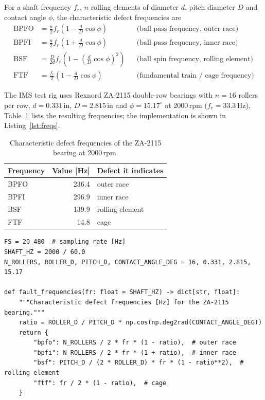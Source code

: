 \documentclass[11pt]{article}
\begin{document}
For a shaft frequency $f_r$, $n$ rolling elements of diameter $d$, pitch diameter $D$ and contact angle
$\phi$, the characteristic defect frequencies are
\begin{align}
\text{BPFO} &= \frac{n}{2} f_r \left(1 - \frac{d}{D}\cos\phi\right) && \text{(ball pass frequency, outer race)}\\
\text{BPFI} &= \frac{n}{2} f_r \left(1 + \frac{d}{D}\cos\phi\right) && \text{(ball pass frequency, inner race)}\\
\text{BSF}  &= \frac{D}{2d} f_r \left(1 - \left(\frac{d}{D}\cos\phi\right)^2\right) && \text{(ball spin frequency, rolling element)}\\
\text{FTF}  &= \frac{f_r}{2} \left(1 - \frac{d}{D}\cos\phi\right) && \text{(fundamental train / cage frequency)}
\end{align}

The IMS test rig uses Rexnord ZA-2115 double-row bearings with $n=16$ rollers per row,
$d = 0.331$\,in, $D = 2.815$\,in and $\phi = 15.17^\circ$ at 2000\,rpm ($f_r = 33.3$\,Hz).
Table~\ref{tab:freqs} lists the resulting frequencies; the implementation is shown in
Listing~\ref{lst:freqs}.

\begin{table}[H]
\centering
\caption{Characteristic defect frequencies of the ZA-2115 bearing at 2000\,rpm.}
\label{tab:freqs}
\begin{tabular}{lrl}
\toprule
Frequency & Value [Hz] & Defect it indicates \\
\midrule
BPFO & 236.4 & outer race \\
BPFI & 296.9 & inner race \\
BSF  & 139.9 & rolling element \\
FTF  & 14.8  & cage \\
\bottomrule
\end{tabular}
\end{table}

\begin{lstlisting}[caption={Defect frequencies from the bearing geometry (\code{src/bearing\_efw/dataset.py}).},label=lst:freqs]
FS = 20_480  # sampling rate [Hz]
SHAFT_HZ = 2000 / 60.0
N_ROLLERS, ROLLER_D, PITCH_D, CONTACT_ANGLE_DEG = 16, 0.331, 2.815, 15.17

def fault_frequencies(fr: float = SHAFT_HZ) -> dict[str, float]:
    """Characteristic defect frequencies [Hz] for the ZA-2115 bearing."""
    ratio = ROLLER_D / PITCH_D * np.cos(np.deg2rad(CONTACT_ANGLE_DEG))
    return {
        "bpfo": N_ROLLERS / 2 * fr * (1 - ratio),  # outer race
        "bpfi": N_ROLLERS / 2 * fr * (1 + ratio),  # inner race
        "bsf": PITCH_D / (2 * ROLLER_D) * fr * (1 - ratio**2),  # rolling element
        "ftf": fr / 2 * (1 - ratio),  # cage
    }
\end{lstlisting}
\end{document}
